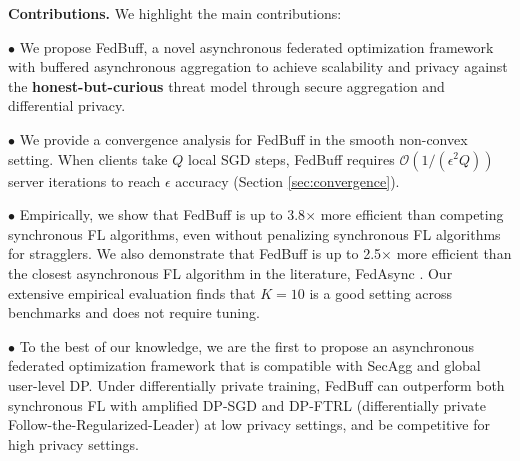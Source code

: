 \documentclass[twoside]{article}
\newcommand{\john}[1]{\todo[color=yellow!20,size=\footnotesize,inline,caption={}]{JN: #1}{}}
\newcommand{\mike}[1]{\todo[color=blue!20,size=\footnotesize,inline,caption={}]{MR: #1}{}}
\newcommand{\kshitiz}[1]{\todo[color=red!20,size=\footnotesize,inline,caption={}]{KM: #1}{}}
\newcommand{\order}[1]{\mathcal{O}\left(#1\right)}
\newcommand{\algname}{{FedBuff}\xspace}
\newcommand{\asyncfl}{{AsyncFL}\xspace}
\begin{document}

\textbf{Contributions.}
We highlight the main contributions: 

    $\bullet$ We propose \algname{}, a novel asynchronous federated optimization framework with buffered asynchronous aggregation to achieve scalability and privacy against the \textbf{honest-but-curious} threat model through secure aggregation and differential privacy.
     
    $\bullet$ We provide a convergence analysis for \algname in the smooth non-convex setting. When clients take $Q$ local SGD steps, \algname requires $\order{1/(\epsilon^2 Q)}$ server iterations to reach $\epsilon$ accuracy (Section \ref{sec:convergence}).
    
    $\bullet$ Empirically, we show that \algname{} is up to 3.8$\times$ more efficient than competing synchronous FL algorithms,  even without penalizing synchronous FL algorithms for stragglers. We also demonstrate that \algname{} is up to 2.5$\times$ more efficient than the closest asynchronous FL algorithm in the literature, FedAsync \citep{fedasync}. Our extensive empirical evaluation finds that $K = 10$ is a good setting across benchmarks and does not require tuning. 

    $\bullet$ To the best of our knowledge, we are the first to propose an asynchronous federated optimization framework that is compatible with SecAgg and global user-level DP. Under differentially private training, \algname can outperform both synchronous FL with amplified DP-SGD and DP-FTRL (differentially private Follow-the-Regularized-Leader) at low privacy settings, and be competitive for high privacy settings. 
\end{document}
